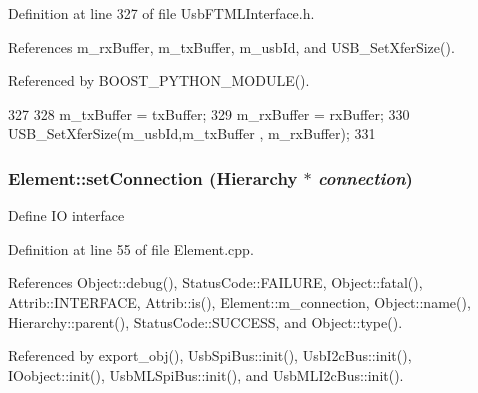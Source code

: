 Definition at line 327 of file UsbFTMLInterface.h.

References m\_\-rxBuffer, m\_\-txBuffer, m\_\-usbId, and USB\_\-SetXferSize().

Referenced by BOOST\_\-PYTHON\_\-MODULE().


\begin{DoxyCode}
327                                               {
328     m_txBuffer = txBuffer;
329     m_rxBuffer = rxBuffer;
330     USB_SetXferSize(m_usbId,m_txBuffer , m_rxBuffer);
331   }
\end{DoxyCode}
\hypertarget{classElement_ab476b4b1df5954141ceb14f072433b89}{
\subsubsection[{setConnection}]{ Element::setConnection ({\bf Hierarchy} $\ast$ {\em connection})}}
\label{classElement_ab476b4b1df5954141ceb14f072433b89}
Define IO interface 

Definition at line 55 of file Element.cpp.

References Object::debug(), StatusCode::FAILURE, Object::fatal(), Attrib::INTERFACE, Attrib::is(), Element::m\_\-connection, Object::name(), Hierarchy::parent(), StatusCode::SUCCESS, and Object::type().

Referenced by export\_\-obj(), UsbSpiBus::init(), UsbI2cBus::init(), IOobject::init(), UsbMLSpiBus::init(), and UsbMLI2cBus::init().


